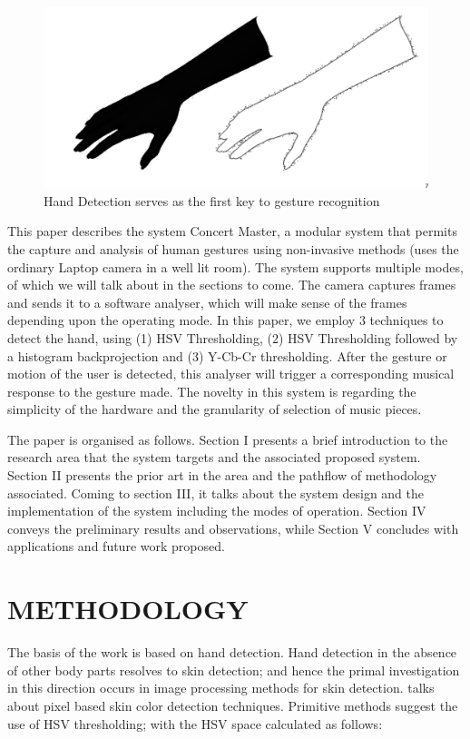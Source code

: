 \documentclass[letterpaper, 10 pt, twoside, conference]{ieeeconf}
\begin{document}
\begin{figure}[h]
  \centering
  \includegraphics[width=0.8\columnwidth]{Appearance_hands.jpg}
  \caption{Hand Detection serves as the first key to gesture recognition}
  \label{Overall1}
\end{figure}

This paper describes the system Concert Master, a modular system that permits the capture and analysis of human gestures using non-invasive methods (uses the ordinary Laptop camera in a well lit room).
The system supports multiple modes, of which we will talk about in the sections to come. The camera
captures frames and sends it to a software analyser, which will make sense of the frames depending
upon the operating mode. In this paper, we employ 3 techniques to detect the hand, using (1) HSV Thresholding,
(2) HSV Thresholding followed by a histogram backprojection and (3) Y-Cb-Cr thresholding. After the gesture or motion of the user is detected, this analyser will
trigger a corresponding musical response to the gesture made. The novelty in this system is regarding the
simplicity of the hardware and the granularity of selection of music pieces.

The paper is organised as follows. Section I presents a brief introduction to the research area that the system targets and
the associated proposed system. Section II presents the prior art in the area and the
pathflow of methodology associated. Coming to section III, it talks about the system design
and the implementation of the system including the modes of operation. Section IV conveys the
preliminary results and observations, while Section V concludes with applications and future
work proposed.

\section{METHODOLOGY}
\label{sec:pagestyle}

The basis of the work is based on hand detection. Hand detection in the absence of
other body parts resolves to skin detection; and hence the primal investigation in this
direction occurs in image processing methods for skin detection. \cite{pixelskin} talks
about pixel based skin color detection techniques. Primitive methods
suggest the use of HSV thresholding; with the HSV space calculated as follows:
\end{document}
